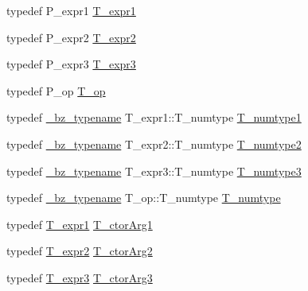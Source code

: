\begin{DoxyCompactItemize}
\item 
typedef P\+\_\+expr1 \hyperlink{class__bz__ArrayExprTernaryOp_af7fa0e8d4f015bc9ab42313078639196}{T\+\_\+expr1}
\item 
typedef P\+\_\+expr2 \hyperlink{class__bz__ArrayExprTernaryOp_a392ed3a88602f5352a558ce6277cde22}{T\+\_\+expr2}
\item 
typedef P\+\_\+expr3 \hyperlink{class__bz__ArrayExprTernaryOp_a809b1acdc0c2ffe359711f40d2688526}{T\+\_\+expr3}
\item 
typedef P\+\_\+op \hyperlink{class__bz__ArrayExprTernaryOp_a41b68c1cd14a31c2ce465fe3d75ebccc}{T\+\_\+op}
\item 
typedef \hyperlink{compiler_8h_a1bc40add3e72effc9cf69dbe445cbdfd}{\+\_\+bz\+\_\+typename} T\+\_\+expr1\+::\+T\+\_\+numtype \hyperlink{class__bz__ArrayExprTernaryOp_adabbc0a8e4ddd154eaa0eb4eb4d78d85}{T\+\_\+numtype1}
\item 
typedef \hyperlink{compiler_8h_a1bc40add3e72effc9cf69dbe445cbdfd}{\+\_\+bz\+\_\+typename} T\+\_\+expr2\+::\+T\+\_\+numtype \hyperlink{class__bz__ArrayExprTernaryOp_abafc4185679a1752fa00ff28a3067612}{T\+\_\+numtype2}
\item 
typedef \hyperlink{compiler_8h_a1bc40add3e72effc9cf69dbe445cbdfd}{\+\_\+bz\+\_\+typename} T\+\_\+expr3\+::\+T\+\_\+numtype \hyperlink{class__bz__ArrayExprTernaryOp_ade1a9d3b50d54a64c0ffaaffd2dd08ee}{T\+\_\+numtype3}
\item 
typedef \hyperlink{compiler_8h_a1bc40add3e72effc9cf69dbe445cbdfd}{\+\_\+bz\+\_\+typename} T\+\_\+op\+::\+T\+\_\+numtype \hyperlink{class__bz__ArrayExprTernaryOp_a9a66d06520e4d8bedb6c754d3f106949}{T\+\_\+numtype}
\item 
typedef \hyperlink{class__bz__ArrayExprTernaryOp_af7fa0e8d4f015bc9ab42313078639196}{T\+\_\+expr1} \hyperlink{class__bz__ArrayExprTernaryOp_a22e778272db72fb375b982abafddc608}{T\+\_\+ctor\+Arg1}
\item 
typedef \hyperlink{class__bz__ArrayExprTernaryOp_a392ed3a88602f5352a558ce6277cde22}{T\+\_\+expr2} \hyperlink{class__bz__ArrayExprTernaryOp_aa738422b796c355bfb6e745a465a3d82}{T\+\_\+ctor\+Arg2}
\item 
typedef \hyperlink{class__bz__ArrayExprTernaryOp_a809b1acdc0c2ffe359711f40d2688526}{T\+\_\+expr3} \hyperlink{class__bz__ArrayExprTernaryOp_a16f21234186e83d551d36d5b248aeeeb}{T\+\_\+ctor\+Arg3}
\end{DoxyCompactItemize}
